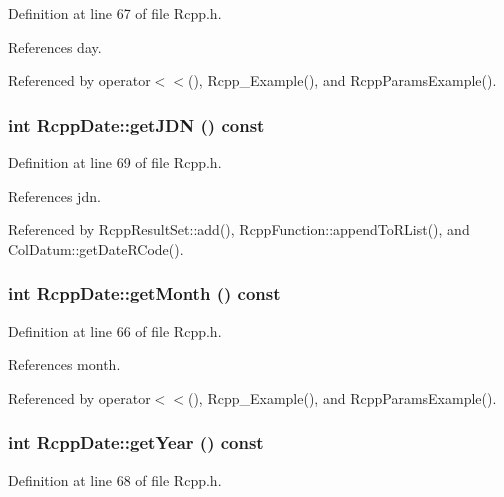 Definition at line 67 of file Rcpp.h.

References day.

Referenced by operator$<$$<$(), Rcpp\_\-Example(), and RcppParamsExample().\hypertarget{classRcppDate_71332de00640903fe99ce13a37fd9f67}{
\subsubsection[{getJDN}]{\setlength{\rightskip}{0pt plus 5cm}int RcppDate::getJDN () const}}
\label{classRcppDate_71332de00640903fe99ce13a37fd9f67}




Definition at line 69 of file Rcpp.h.

References jdn.

Referenced by RcppResultSet::add(), RcppFunction::appendToRList(), and ColDatum::getDateRCode().\hypertarget{classRcppDate_16ca2d57a2c4047b027c8b8b0db5184f}{
\subsubsection[{getMonth}]{\setlength{\rightskip}{0pt plus 5cm}int RcppDate::getMonth () const}}
\label{classRcppDate_16ca2d57a2c4047b027c8b8b0db5184f}




Definition at line 66 of file Rcpp.h.

References month.

Referenced by operator$<$$<$(), Rcpp\_\-Example(), and RcppParamsExample().\hypertarget{classRcppDate_79a7696fbce7b448ab545ce35c40811b}{
\subsubsection[{getYear}]{\setlength{\rightskip}{0pt plus 5cm}int RcppDate::getYear () const}}
\label{classRcppDate_79a7696fbce7b448ab545ce35c40811b}




Definition at line 68 of file Rcpp.h.

